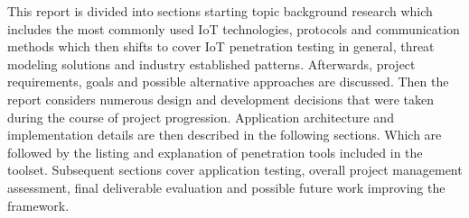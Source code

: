 This report is divided into sections starting topic background research which includes the most commonly used IoT technologies, protocols and communication methods which then shifts to cover IoT penetration testing in general, threat modeling solutions and industry established patterns. Afterwards, project requirements, goals and possible alternative approaches are discussed. Then the report considers numerous design and development decisions that were taken during the course of project progression. Application architecture and implementation details are then described in the following sections. Which are followed by the listing and explanation of penetration tools included in the toolset. Subsequent sections cover application testing, overall project management assessment, final deliverable evaluation and possible future work improving the framework.